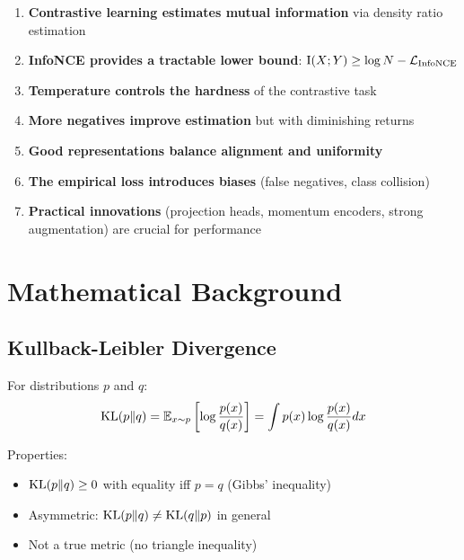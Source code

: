 \begin{notechapter}
\begin{enumerate}
    \item \textbf{Contrastive learning estimates mutual information} via density ratio estimation
    
    \item \textbf{InfoNCE provides a tractable lower bound}: $\mathrm{I}(X;Y) \geq \log N - \mathcal{L}_{\text{InfoNCE}}$
    
    \item \textbf{Temperature controls the hardness} of the contrastive task
    
    \item \textbf{More negatives improve estimation} but with diminishing returns
    
    \item \textbf{Good representations balance alignment and uniformity}
    
    \item \textbf{The empirical loss introduces biases} (false negatives, class collision)
    
    \item \textbf{Practical innovations} (projection heads, momentum encoders, strong augmentation) are crucial for performance
\end{enumerate}

\chapterappendix

\section{Mathematical Background}

\subsection{Kullback-Leibler Divergence}

\begin{definition}[KL Divergence]
For distributions $p$ and $q$:
\begin{equation}
\mathrm{KL}(p \| q) = \mathbb{E}_{x \sim p}\left[\log \frac{p(x)}{q(x)}\right] = \int p(x) \log \frac{p(x)}{q(x)} dx
\end{equation}
\end{definition}

Properties:
\begin{itemize}
    \item $\mathrm{KL}(p \| q) \geq 0$ with equality iff $p = q$ (Gibbs' inequality)
    \item Asymmetric: $\mathrm{KL}(p \| q) \neq \mathrm{KL}(q \| p)$ in general
    \item Not a true metric (no triangle inequality)
\end{itemize}


\end{notechapter}
